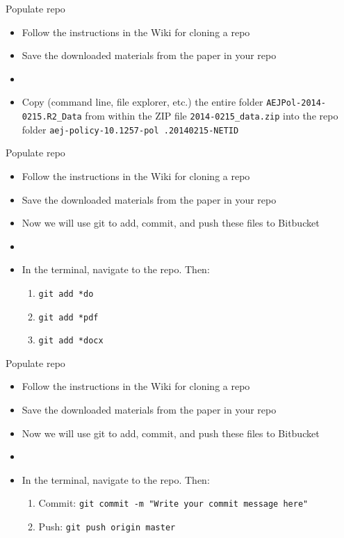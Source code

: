 \documentclass[xcolor={dvipsnames}]{beamer}
\theoremstyle{definition}
\begin{document}
\begin{frame}{Populate repo}
\begin{itemize}
	\item Follow the instructions in the Wiki for cloning a repo
	\item Save the downloaded materials from the paper in your repo
	\item[]
	\item Copy (command line, file explorer, etc.) the entire folder \texttt{AEJPol-2014-0215.R2\_Data} from within the ZIP file \texttt{2014-0215\_data.zip} into the repo folder \texttt{aej-policy-10.1257-pol
		.20140215-NETID}
\end{itemize}
\end{frame}



\begin{frame}{Populate repo}
\begin{itemize}
	\item Follow the instructions in the Wiki for cloning a repo
	\item Save the downloaded materials from the paper in your repo
	\item Now we will use git to add, commit, and push these files to Bitbucket
    \item[]
	\item In the terminal, navigate to the repo. Then:
	\begin{enumerate}
		\item \texttt{git add *do} 
		\item \texttt{git add *pdf}
		\item \texttt{git add *docx}
	\end{enumerate}
\end{itemize}
\end{frame}

\begin{frame}{Populate repo}
\begin{itemize}
	\item Follow the instructions in the Wiki for cloning a repo
	\item Save the downloaded materials from the paper in your repo
	\item Now we will use git to add, commit, and push these files to Bitbucket
	\item[]
	\item In the terminal, navigate to the repo. Then:
    \begin{enumerate}
	\item Commit: \texttt{git commit -m "Write your commit message here"}
	 \pause
	\item Push: \texttt{git push origin master}
    \end{enumerate}
\end{itemize}
\end{frame}
\end{document}
